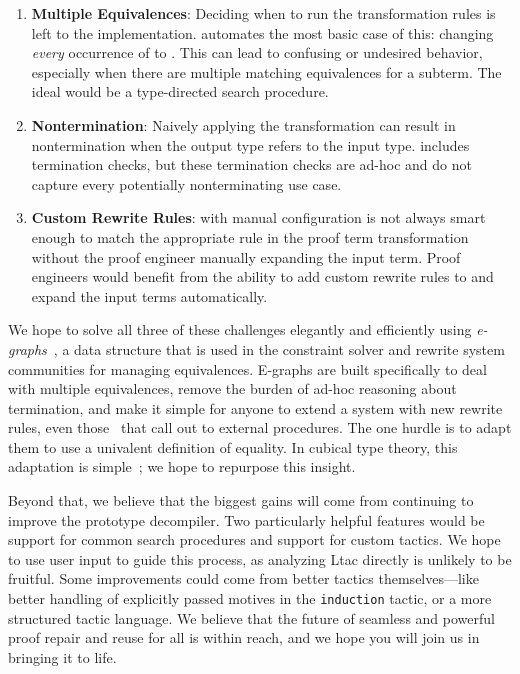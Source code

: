 \begin{enumerate}
\item \textbf{Multiple Equivalences}: Deciding when to run the transformation rules is left to the implementation.
\toolname automates the most basic case of this: changing \textit{every} occurrence of \A to \B.
This can lead to confusing or undesired behavior, especially when there are multiple matching equivalences for a subterm.
The ideal would be a type-directed search procedure.
\item \textbf{Nontermination}: Naively applying the transformation can result in nontermination when the output type refers to the input type.
\toolname includes termination checks, but these termination checks are ad-hoc and do not capture every potentially nonterminating use case.
\item \textbf{Custom Rewrite Rules}: \toolname with manual configuration is not always smart enough to match the appropriate rule in the proof term
transformation without the proof engineer manually expanding the input term.
Proof engineers would benefit from the ability to add custom rewrite rules to \toolname
and expand the input terms automatically.
\end{enumerate}
We hope to solve all three of these challenges elegantly and efficiently using \textit{e-graphs}~\cite{egraph1},
a data structure that is used in the constraint solver and rewrite system communities for managing equivalences.
E-graphs are built specifically to deal with multiple equivalences,
remove the burden of ad-hoc reasoning about termination,
and make it simple for anyone to extend a system with new
rewrite rules, even those~\cite{egraph5} that call out
to external procedures.
The one hurdle is to adapt them to use a univalent definition of equality.
In cubical type theory, this adaptation is simple~\cite{egraph6}; we hope to repurpose this insight.

Beyond that, we believe that the biggest gains will come from continuing to improve the prototype decompiler.
Two particularly helpful features would be support for common search procedures and support for custom tactics.
We hope to use user input to guide this process, as analyzing Ltac directly is unlikely to be fruitful.
Some improvements could come from better tactics themselves---like better handling of explicitly passed 
motives in the \lstinline{induction} tactic, or a more structured tactic language.
We believe that the future of seamless and powerful proof repair and reuse for all is within reach,
and we hope you will join us in bringing it to life.



